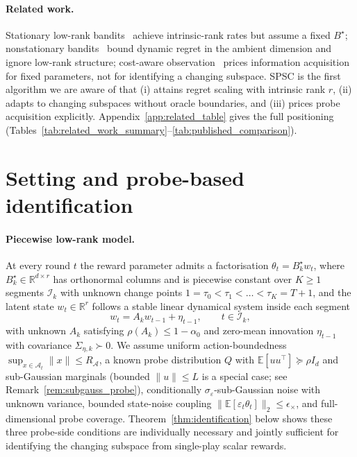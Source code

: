 \documentclass{article}
\newcommand{\R}{\mathbb{R}}
\newcommand{\E}{\mathbb{E}}
\newcommand{\cA}{\mathcal{A}}
\newcommand{\cI}{\mathcal{I}}
\begin{document}
\paragraph{Related work.}
Stationary low-rank
bandits~\citep{jun2019bilinear,kang2022efficient,jedra2024low,jang2024efficient,stojanovic2023spectral,duong2024beyond,lu2021low}
achieve intrinsic-rank rates but assume a fixed $B^\star$;
nonstationary
bandits~\citep{russac2019weighted,cheung2019learning,abbasi2023new,hou2024almost,kim2022improved}
bound dynamic regret in the ambient dimension and ignore low-rank
structure; cost-aware
observation~\citep{seldin2014prediction,tucker2023bandits,elumar2024multi}
prices information acquisition for fixed parameters, not for
identifying a changing subspace. SPSC is the first algorithm we
are aware of that (i) attains regret scaling with intrinsic rank
$r$, (ii) adapts to changing subspaces without oracle boundaries,
and (iii) prices probe acquisition explicitly.
Appendix~\ref{app:related_table} gives the full positioning
(Tables~\ref{tab:related_work_summary}--\ref{tab:published_comparison}).

\section{Setting and probe-based identification}
\label{sec:setting}

\paragraph{Piecewise low-rank model.}
At every round $t$ the reward parameter admits a factorisation
$\theta_t = B_k^\star w_t$, where $B_k^\star \in \R^{d\times r}$ has
orthonormal columns and is piecewise constant over $K\ge 1$ segments
$\cI_k$ with unknown change points
$1=\tau_0<\tau_1<\dots<\tau_K=T{+}1$, and the latent state $w_t\in
\R^r$ follows a stable linear dynamical system inside each segment
\[
 w_t = A_k w_{t-1} + \eta_{t-1}, \qquad t \in \cI_k,
\]
with unknown $A_k$ satisfying $\rho(A_k)\le 1{-}\alpha_0$ and zero-mean
innovation $\eta_{t-1}$ with covariance $\Sigma_{\eta,k}\succ 0$. We
assume uniform action-boundedness $\sup_{x\in\cA_t}\|x\|\le R_\cA$,
a known probe distribution $Q$ with $\E[uu^\top]\succeq \rho I_d$ and
sub-Gaussian marginals (bounded $\|u\|\le L$ is a special case; see
Remark~\ref{rem:subgauss_probe}), conditionally
$\sigma_\varepsilon$-sub-Gaussian noise with unknown variance, bounded
state-noise coupling
$\|\E[\varepsilon_t\theta_t]\|_2 \le \epsilon_\times$, and
full-dimensional probe coverage. Theorem~\ref{thm:identification}
below shows these three probe-side conditions are individually
necessary and jointly sufficient for identifying the changing
subspace from single-play scalar rewards.
\end{document}

